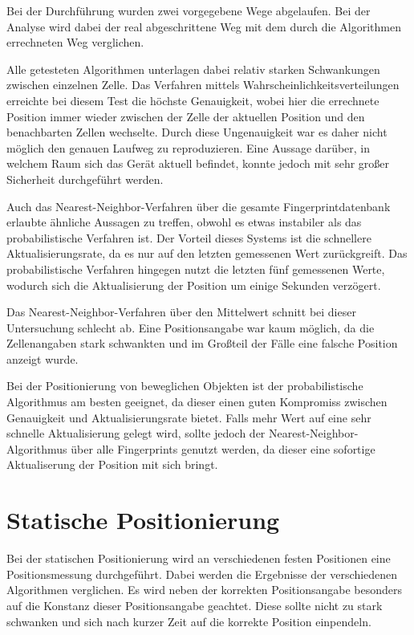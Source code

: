Bei der Durchführung wurden zwei vorgegebene Wege abgelaufen. Bei der Analyse wird dabei der real abgeschrittene Weg mit dem durch die Algorithmen errechneten Weg verglichen.

Alle getesteten Algorithmen unterlagen dabei relativ starken Schwankungen zwischen einzelnen Zelle. Das Verfahren mittels Wahrscheinlichkeitsverteilungen erreichte bei diesem Test die höchste Genauigkeit, wobei hier die errechnete Position immer wieder zwischen der Zelle der aktuellen Position und den benachbarten Zellen wechselte. Durch diese Ungenauigkeit war es daher nicht möglich den genauen Laufweg zu reproduzieren. Eine Aussage darüber, in welchem Raum sich das Gerät aktuell befindet, konnte jedoch mit sehr großer Sicherheit durchgeführt werden.

Auch das Nearest-Neighbor-Verfahren über die gesamte Fingerprintdatenbank erlaubte ähnliche Aussagen zu treffen, obwohl es etwas instabiler als das probabilistische Verfahren ist. Der Vorteil dieses Systems ist die schnellere Aktualisierungsrate, da es nur auf den letzten gemessenen Wert zurückgreift. Das probabilistische Verfahren hingegen nutzt die letzten fünf gemessenen Werte, wodurch sich die Aktualisierung der Position um einige Sekunden verzögert.

Das Nearest-Neighbor-Verfahren über den Mittelwert schnitt bei dieser Untersuchung schlecht ab. Eine Positionsangabe war kaum möglich, da die Zellenangaben stark schwankten und im Großteil der Fälle eine falsche Position anzeigt wurde.


Bei der Positionierung von beweglichen Objekten ist der probabilistische Algorithmus am besten geeignet, da dieser einen guten Kompromiss zwischen Genauigkeit und Aktualisierungsrate bietet. Falls mehr Wert auf eine sehr schnelle Aktualisierung gelegt wird, sollte jedoch der Nearest-Neighbor-Algorithmus über alle Fingerprints genutzt werden, da dieser eine sofortige Aktualiserung der Position mit sich bringt.

\section{Statische Positionierung}
\label{sec:testing:static}

Bei der statischen Positionierung wird an verschiedenen festen Positionen eine Positionsmessung durchgeführt. Dabei werden die Ergebnisse der verschiedenen Algorithmen verglichen. Es wird neben der korrekten Positionsangabe besonders auf die Konstanz dieser Positionsangabe geachtet. Diese sollte nicht zu stark schwanken und sich nach kurzer Zeit auf die korrekte Position einpendeln.

